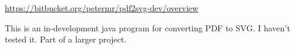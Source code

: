 \documentclass[12pt]{article}
\begin{document}
\url{https://bitbucket.org/petermr/pdf2svg-dev/overview}

This is an in-development java program for converting PDF to SVG.  I
haven't tested it.  Part of a larger project.





\end{document}
